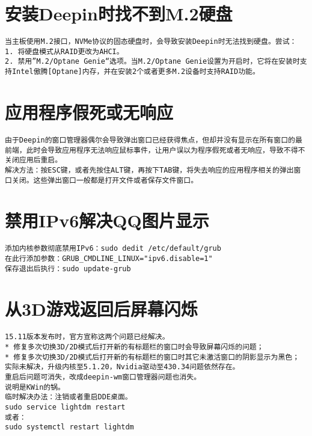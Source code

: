 \documentclass[a4paper,fontset=fandol,zihao=-4,linespread=1.2]{ctexbook}
\begin{document}
\section{安装Deepin时找不到M.2硬盘}
\begin{lstlisting}
当主板使用M.2接口，NVMe协议的固态硬盘时，会导致安装Deepin时无法找到硬盘。尝试：
1. 将硬盘模式从RAID更改为AHCI。
2. 禁用”M.2/Optane Genie“选项。当M.2/Optane Genie设置为开启时，它将在安装时支持Intel傲腾[Optane]内存，并在安装2个或者更多M.2设备时支持RAID功能。
\end{lstlisting}

\section{应用程序假死或无响应}
\begin{lstlisting}
由于Deepin的窗口管理器偶尔会导致弹出窗口已经获得焦点，但却并没有显示在所有窗口的最前端，此时会导致应用程序无法响应鼠标事件，让用户误以为程序假死或者无响应，导致不得不关闭应用后重启。
解决方法：按ESC键，或者先按住ALT键，再按下TAB键，将失去响应的应用程序相关的弹出窗口关闭。这些弹出窗口一般都是打开文件或者保存文件窗口。
\end{lstlisting}

\section{禁用IPv6解决QQ图片显示}
\begin{lstlisting}
添加内核参数彻底禁用IPv6：sudo dedit /etc/default/grub
在此行添加参数：GRUB_CMDLINE_LINUX="ipv6.disable=1"
保存退出后执行：sudo update-grub
\end{lstlisting}

\section{从3D游戏返回后屏幕闪烁}
\begin{lstlisting}
15.11版本发布时，官方宣称这两个问题已经解决。
* 修复多次切换3D/2D模式后打开新的有标题栏的窗口时会导致屏幕闪烁的问题；
* 修复多次切换3D/2D模式后打开新的有标题栏的窗口时其它未激活窗口的阴影显示为黑色；
实际未解决，升级内核至5.1.20，Nvidia驱动至430.34问题依然存在。
重启后问题可消失，改成deepin-wm窗口管理器问题也消失。
说明是KWin的锅。
临时解决办法：注销或者重启DDE桌面。
sudo service lightdm restart
或者：
sudo systemctl restart lightdm
\end{lstlisting}
\end{document}
